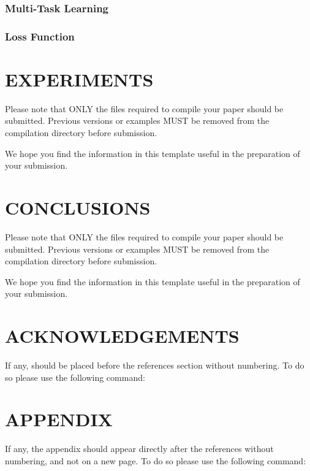 \documentclass[a4paper,twoside]{article}
\begin{document}
\subsubsection{Multi-Task Learning}
\subsubsection{Loss Function}


\section{\uppercase{EXPERIMENTS}}
\label{sec:experiments}

Please note that ONLY the files required to compile your paper should be submitted. Previous versions or examples MUST be removed from the compilation directory before submission.

We hope you find the information in this template useful in the preparation of your submission.

\section{\uppercase{CONCLUSIONS}}
\label{sec:conclusions}

Please note that ONLY the files required to compile your paper should be submitted. Previous versions or examples MUST be removed from the compilation directory before submission.

We hope you find the information in this template useful in the preparation of your submission.

\section*{\uppercase{Acknowledgements}}

If any, should be placed before the references section
without numbering. To do so please use the following command:




{\small
}


\section*{\uppercase{Appendix}}

If any, the appendix should appear directly after the
references without numbering, and not on a new page. To do so please use the following command:
\end{document}
